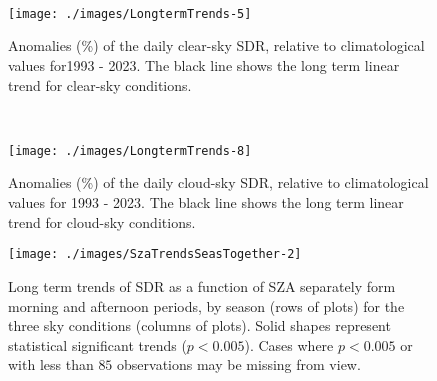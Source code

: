 \appendix

\section[\appendixname~\thesection]{} %

\  \


\begin{figure}[h!]

{\centering \texttt{[image: ./images/LongtermTrends-5]}}

\caption{Anomalies (\%) of the daily clear-sky SDR, relative to climatological values for1993 - 2023. The black line shows the long term linear trend for clear-sky conditions.}\label{fig:trendCLEAR}
\end{figure}

\  \

\begin{figure}[h!]

{\centering \texttt{[image: ./images/LongtermTrends-8]}}

\caption{Anomalies (\%) of the daily cloud-sky SDR, relative to climatological values for 1993 - 2023. The black line shows the long term linear trend for cloud-sky conditions.}\label{fig:trendCLOUD}
\end{figure}

\begin{figure}[h!]

{\centering \texttt{[image: ./images/SzaTrendsSeasTogether-2]}}

\caption{Long term trends of SDR as a function of SZA separately form morning and afternoon
periods, by season (rows of plots) for the three sky conditions (columns of plots).
Solid shapes represent statistical significant trends ($p<0.005$).
Cases where $p<0.005$ or with less than $85$ observations may be missing from view.}\label{fig:SZAtrendSeason}
\end{figure}


